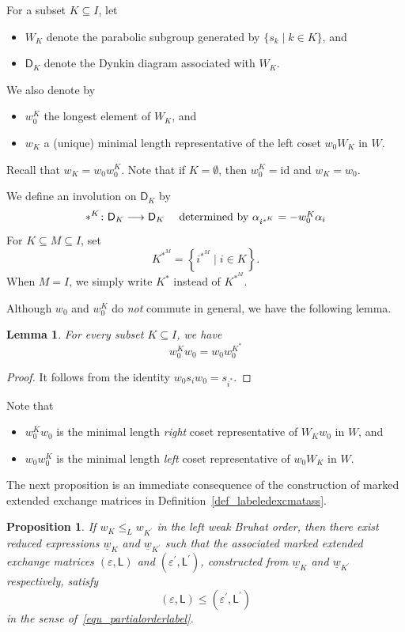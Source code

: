 \documentclass[11pt]{amsart}
\numberwithin{equation}{section}
\theoremstyle{plain}
\newtheorem{proposition}[theorem]{Proposition}
\newtheorem{lemma}[theorem]{Lemma}
\theoremstyle{definition}
\def\to{\mathchoice{\longrightarrow}{\rightarrow}{\rightarrow}{\rightarrow}}
\numberwithin{equation}{section}
\begin{document}
For a subset $K \subseteq I$, let 
\begin{itemize}
\item $W_{K}$ denote the parabolic subgroup generated by $\{ s_{{k}} \mid k \in K\}$, and
\item $\mathsf{D}_K$ denote the Dynkin diagram associated with $W_K$.
\end{itemize}
We also denote by
\begin{itemize}
\item $w^{K}_0$ the longest element of $W_K$, and
\item $w_{K}$ a (unique) minimal length representative of the left coset $w_0 W_{K}$ in $W$. 
\end{itemize}
Recall that $w_K = w_0 w^K_{0}$. Note that if $K = \emptyset$, then $w^{K}_0 = \mathrm{id}$ and $w_K = w_0$. 

We define an involution on $\mathsf{D}_K$ by
$$
*^K \colon \mathsf{D}_K \to \mathsf{D}_K \quad \mbox{ determined by $\alpha_{i^{*^K}} = -w_0^K \alpha_i$}
$$
For $K \subseteq M \subseteq I$, set
$$
K^{*^M} = \left\{ i^{*^M} \mid i \in K \right\}.
$$
When $M = I$, we simply write $K^{*}$ instead of $K^{*^M}$.

Although $w_0$ and $w_0^K$ do \emph{not} commute in general, we have the following lemma. 
\begin{lemma}\label{lemma_w0Kw0}
For every subset $K \subseteq I$, we have 
$$
w_0^K w_0 = w_0 w_0^{K^*}
$$
\end{lemma}

\begin{proof}
It follows from the identity $w_0 s_i w_0 = s_{i^*}$.
\end{proof}

Note that 
\begin{itemize}
\item $w_0^K w_0$ is the minimal length \emph{right} coset representative of $W_Kw_0$ in $W$, and 
\item $w_0 w_0^K$ is the minimal length \emph{left} coset representative of $w_0W_K$ in $W$. 
\end{itemize}
The next proposition is an immediate consequence of the construction of marked extended exchange matrices in Definition~\ref{def_labeledexcmatass}.

\begin{proposition}\label{proposition_weakBorderlabel}
If $w_{K} \leq_L w_{{K^\prime}}$ in the \emph{left} weak Bruhat order, then there exist reduced expressions $\underline{w}_{K}$ and  $\underline{w}_{{K^\prime}}$ such that the associated marked extended exchange matrices $(\varepsilon, \mathsf{L})$ and $(\varepsilon^\prime, \mathsf{L}^\prime)$, constructed from $\underline{w}_{K}$ and  $\underline{w}_{{K^\prime}}$ respectively, satisfy
$$
(\varepsilon, \mathsf{L}) \leq (\varepsilon^\prime, \mathsf{L}^\prime)
$$ 
in the sense of~\eqref{equ_partialorderlabel}.
\end{proposition}
\end{document}
